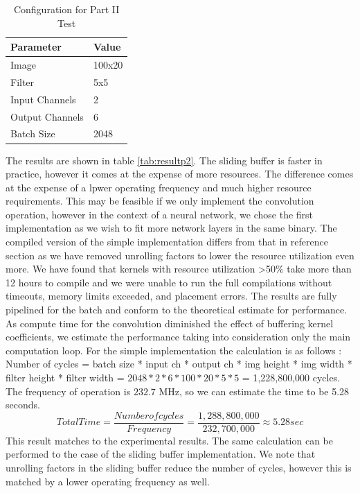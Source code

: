 \begin{table}[]
\centering
\begin{tabular}{|l|l|}
\hline
\textbf{Parameter} & \textbf{Value} \\ \hline
Image              & 100x20          \\ \hline
Filter             & 5x5            \\ \hline
Input Channels     & 2             \\ \hline
Output Channels    & 6             \\ \hline
Batch Size         & 2048           \\ \hline
\end{tabular}
\caption{Configuration for Part II Test}
\label{tab:l3params}
\end{table}

The results are shown in table \ref{tab:resultp2}. The sliding buffer is faster in practice, however it comes at the expense of more resources. The difference comes at the expense of a lpwer operating frequency and much higher resource requirements. This may be feasible if we only implement the convolution operation, however in the context of a neural network, we chose the first implementation as we wish to fit more network layers in the same binary. The compiled version of the simple implementation differs from that in reference section as we have removed unrolling factors to lower the resource utilization even more. We have found that kernels with resource utilization >50\% take more than 12 hours to compile and we were unable to run the full compilations without timeouts, memory limits exceeded, and placement errors. The results are fully pipelined for the batch and conform to the theoretical estimate for performance. As compute time for the convolution diminished the effect of buffering kernel coefficients, we estimate the performance taking into consideration only the main computation loop. For the simple implementation the calculation is as follows : \newline Number of cycles = batch size * input ch * output ch * img height * img width * filter height * 
filter width  = $2048 * 2 * 6 * 100 * 20 * 5 * 5 $ = 1,228,800,000 cycles. The frequency of operation is $232.7$ MHz, so we can estimate the time to be 5.28 seconds.
\begin{equation}
 Total Time = \frac{Number of cycles}{Frequency} = \frac{1,288,800,000}{232,700,000}  \approx 5.28 sec
\end{equation}
This result matches to the experimental results. The same calculation can be performed to the case of the sliding buffer implementation. We note that unrolling factors in the sliding buffer reduce the number of cycles, however this is matched by a lower operating frequency as well.

